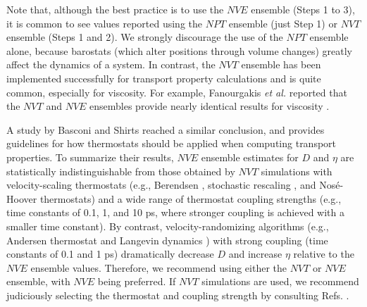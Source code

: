 \documentclass[9pt,bestpractices]{livecoms}
\begin{document}

Note that, although the best practice is to use the $NVE$ ensemble (Steps 1 to 3), it is common to see values reported using the $NPT$ ensemble (just Step 1) or $NVT$ ensemble (Steps 1 and 2). We strongly discourage the use of the $NPT$ ensemble alone, because barostats (which alter positions through volume changes) greatly affect the dynamics of a system. In contrast, the $NVT$ ensemble has been implemented successfully for transport property calculations and is quite common, especially for viscosity. For example, Fanourgakis \textit{et al.} reported that the $NVT$ and $NVE$ ensembles provide nearly identical results for viscosity \cite{Fanourgakis2012}. 

A study by Basconi and Shirts \cite{Shirts2013} reached a similar conclusion, and provides guidelines for how thermostats should be applied when computing transport properties. To summarize their results, $NVE$ ensemble estimates for $D$ and $\eta$ are statistically indistinguishable from those obtained by $NVT$ simulations with velocity-scaling thermostats (e.g., Berendsen \cite{Berendsen1984}, stochastic rescaling \cite{Bussi2007}, and Nos{\'e}-Hoover \cite{Nose1984} thermostats) and a wide range of thermostat coupling strengths (e.g., time constants of 0.1, 1, and 10 ps, where stronger coupling is achieved with a smaller time constant). By contrast, velocity-randomizing algorithms (e.g., Andersen thermostat \cite{Andersen1980} and Langevin dynamics \cite{Hess2008}) with strong coupling (time constants of 0.1 and 1 ps) dramatically decrease $D$ and increase $\eta$ relative to the $NVE$ ensemble values. Therefore, we recommend using either the $NVT$ or $NVE$ ensemble, with $NVE$ being preferred. If $NVT$ simulations are used, we recommend judiciously selecting the thermostat and coupling strength by consulting Refs. \cite{Fanourgakis2012,Shirts2013}.


\end{document}
